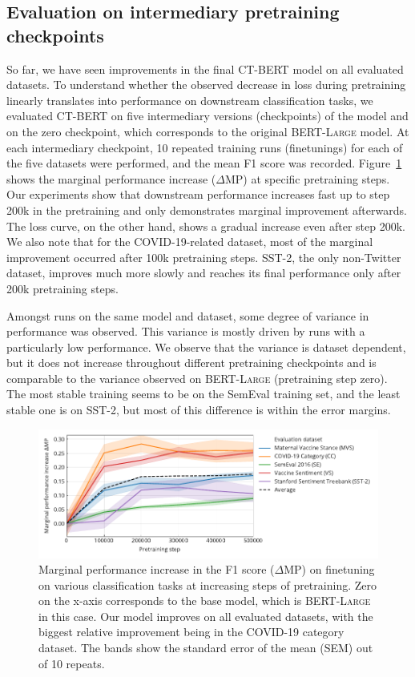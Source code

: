 \documentclass{article}
\begin{document}
\subsection{Evaluation on intermediary pretraining checkpoints}
\label{sec:evaluation_checkpoints}
So far, we have seen improvements in the final \textsc{CT-BERT} model on all evaluated datasets.
To understand whether the observed decrease in loss during pretraining linearly translates into performance on downstream classification tasks, we evaluated CT-BERT on five intermediary versions (checkpoints) of the model and on the zero checkpoint, which corresponds to the original \textsc{BERT-Large} model.
At each intermediary checkpoint, 10 repeated training runs (finetunings) for each of the five datasets were performed, and the mean F1 score was recorded.
Figure~\ref{fig:fig2} shows the marginal performance increase ($\Delta$MP) at specific pretraining steps.
Our experiments show that downstream performance increases fast up to step \num{200}k in the pretraining and only demonstrates marginal improvement afterwards.
The loss curve, on the other hand, shows a gradual increase even after step \num{200}k.
We also note that for the COVID-19-related dataset, most of the marginal improvement occurred after \num{100}k pretraining steps.
SST-2, the only non-Twitter dataset, improves much more slowly and reaches its final performance only after \num{200}k pretraining steps.

Amongst runs on the same model and dataset, some degree of variance in performance was observed.
This variance is mostly driven by runs with a particularly low performance.
We observe that the variance is dataset dependent, but it does not increase throughout different pretraining checkpoints and is comparable to the variance observed on \textsc{BERT-Large} (pretraining step zero).
The most stable training seems to be on the SemEval training set, and the least stable one is on SST-2, but most of this difference is within the error margins.



\begin{figure}
  \centering
  \includegraphics[]{figures/fig2.pdf}
  \caption{
    Marginal performance increase in the F1 score ($\Delta$MP) on finetuning on various classification tasks at increasing steps of pretraining.
    Zero on the x-axis corresponds to the base model, which is \textsc{BERT-Large} in this case.
    Our model improves on all evaluated datasets, with the biggest relative improvement being in the COVID-19 category dataset.
    The bands show the standard error of the mean (SEM) out of 10 repeats.
  }
  \label{fig:fig2}
\end{figure}
\end{document}

